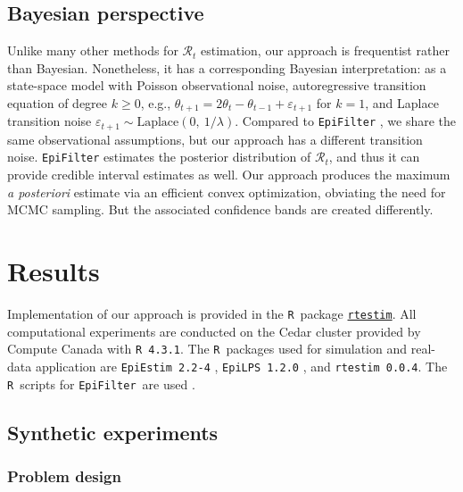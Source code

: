 \documentclass[10pt,letterpaper]{article}
\newcommand{\R}{\texttt{R}}
\def\EpiFilter{\texttt{EpiFilter}}
\def\calR{\mathcal{R}}
\newcommand{\citep}[1]{\cite{#1}}
\begin{document}
\subsection{Bayesian perspective}

Unlike many other methods for $\calR_t$ estimation, our approach is frequentist
rather than Bayesian. Nonetheless, it has a corresponding Bayesian
interpretation: as a state-space model with Poisson observational noise,
autoregressive transition equation of degree $k\geq 0$, e.g., $\theta_{t+1} =
2\theta_t - \theta_{t-1} + \varepsilon_{t+1}$ for $k=1$, and Laplace transition
noise $\varepsilon_{t+1}\sim \mathrm{Laplace}(0,\ 1/\lambda)$. Compared to
\texttt{EpiFilter} \citep{parag2021improved},
 we share the same observational assumptions, but our approach has a
different transition noise. \texttt{EpiFilter} estimates the posterior
distribution of
$\calR_t$, and thus it can provide credible interval estimates as well. Our
approach produces the maximum \emph{a posteriori} estimate via an efficient
convex optimization, obviating the need for MCMC sampling. But the associated
confidence bands are created differently.


\section{Results}

Implementation of our approach is provided in the \R\ package
\href{https://dajmcdon.github.io/rtestim/}{\texttt{rtestim}}. 
All computational experiments are conducted on the Cedar cluster provided 
by Compute Canada with \texttt{R 4.3.1}. The \R\ packages used for
simulation and real-data application are \texttt{EpiEstim 2.2-4} \citep{Cori2022},
\texttt{EpiLPS 1.2.0} \citep{Gressani2021}, and \texttt{rtestim 0.0.4}. 
The \R\ scripts for \EpiFilter\ are used \citep{kpzoo2020}.

\subsection{Synthetic experiments}

\subsubsection{Problem design}
\end{document}
